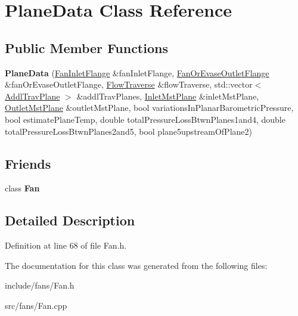 \hypertarget{class_plane_data}{}\section{Plane\+Data Class Reference}
\label{class_plane_data}
\subsection*{Public Member Functions}
\begin{DoxyCompactItemize}
\item 
\mbox{\label{class_plane_data_ae035baf1c5a2f22fdb5a40b23b95e2bc}} 
{\bfseries Plane\+Data} (\hyperlink{class_fan_inlet_flange}{Fan\+Inlet\+Flange} \&fan\+Inlet\+Flange, \hyperlink{class_fan_or_evase_outlet_flange}{Fan\+Or\+Evase\+Outlet\+Flange} \&fan\+Or\+Evase\+Outlet\+Flange, \hyperlink{class_flow_traverse}{Flow\+Traverse} \&flow\+Traverse, std\+::vector$<$ \hyperlink{class_addl_trav_plane}{Addl\+Trav\+Plane} $>$ \&addl\+Trav\+Planes, \hyperlink{class_inlet_mst_plane}{Inlet\+Mst\+Plane} \&inlet\+Mst\+Plane, \hyperlink{class_outlet_mst_plane}{Outlet\+Mst\+Plane} \&outlet\+Mst\+Plane, bool variations\+In\+Planar\+Barometric\+Pressure, bool estimate\+Plane\+Temp, double total\+Pressure\+Loss\+Btwn\+Planes1and4, double total\+Pressure\+Loss\+Btwn\+Planes2and5, bool plane5upstream\+Of\+Plane2)
\end{DoxyCompactItemize}
\subsection*{Friends}
\begin{DoxyCompactItemize}
\item 
\mbox{\label{class_plane_data_a0a305abd4183ca4b5d3adb1b563378d7}} 
class {\bfseries Fan}
\end{DoxyCompactItemize}


\subsection{Detailed Description}


Definition at line 68 of file Fan.\+h.



The documentation for this class was generated from the following files\+:\begin{DoxyCompactItemize}
\item 
include/fans/Fan.\+h\item 
src/fans/Fan.\+cpp\end{DoxyCompactItemize}
